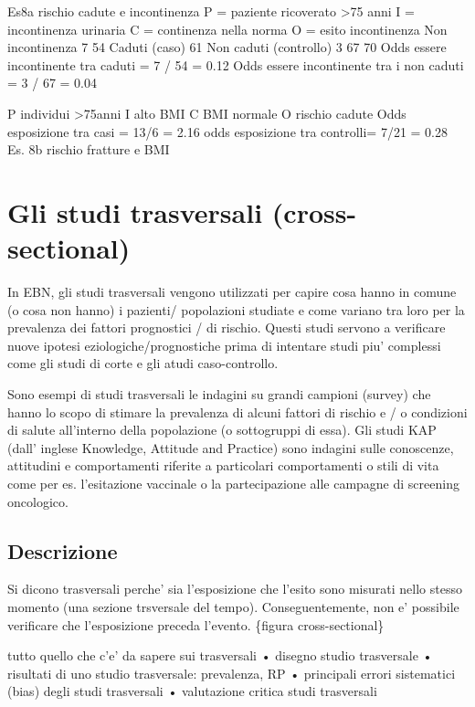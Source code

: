 \documentclass[]{book}
\begin{document}
Es8a rischio cadute e incontinenza
P = paziente ricoverato \textgreater{}75 anni I = incontinenza urinaria
C = continenza nella norma
O = esito
incontinenza
Non incontinenza
7
54
Caduti (caso)
61
Non caduti (controllo)
3
67
70
Odds essere incontinente tra caduti = 7 / 54 = 0.12 Odds essere incontinente tra i non caduti = 3 / 67 = 0.04

P individui \textgreater{}75anni I alto BMI
C BMI normale
O rischio cadute
Odds esposizione tra casi = 13/6 = 2.16 odds esposizione tra controlli= 7/21 = 0.28
Es. 8b rischio fratture e BMI

\hypertarget{gli-studi-trasversali-cross-sectional}{%
\section{Gli studi trasversali (cross-sectional)}\label{gli-studi-trasversali-cross-sectional}}

In EBN, gli studi trasversali vengono utilizzati per capire cosa hanno in comune (o cosa non hanno) i pazienti/ popolazioni studiate e come variano tra loro per la prevalenza dei fattori prognostici / di rischio. Questi studi servono a verificare nuove ipotesi eziologiche/prognostiche prima di intentare studi piu' complessi come gli studi di corte e gli atudi caso-controllo.

Sono esempi di studi trasversali le indagini su grandi campioni (survey) che hanno lo scopo di stimare la prevalenza di alcuni fattori di rischio e / o condizioni di salute all'interno della popolazione (o sottogruppi di essa). Gli studi KAP (dall' inglese Knowledge, Attitude and Practice) sono indagini sulle conoscenze, attitudini e comportamenti riferite a particolari comportamenti o stili di vita come per es. l'esitazione vaccinale o la partecipazione alle campagne di screening oncologico.

\hypertarget{descrizione-3}{%
\subsection{Descrizione}\label{descrizione-3}}

Si dicono trasversali perche' sia l'esposizione che l'esito sono misurati nello stesso momento (una sezione trsversale del tempo). Conseguentemente, non e' possibile verificare che l'esposizione preceda l'evento.
\{figura cross-sectional\}

tutto quello che c'e' da sapere sui trasversali
• disegno studio trasversale
• risultati di uno studio trasversale: prevalenza, RP
• principali errori sistematici (bias) degli studi trasversali
• valutazione critica studi trasversali
\end{document}
